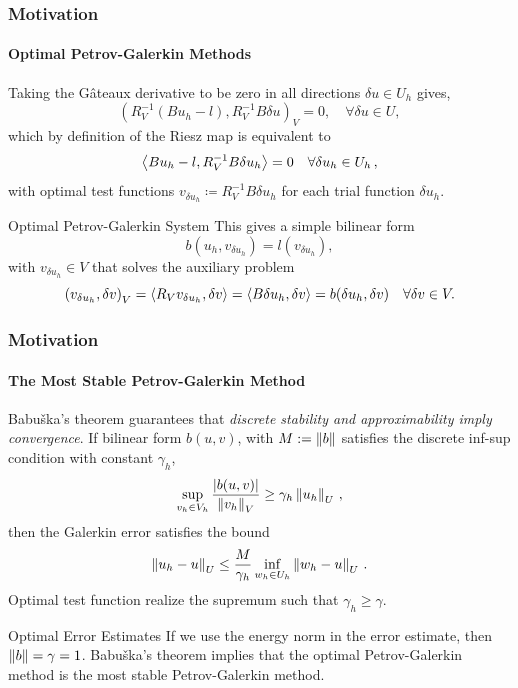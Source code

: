 \documentclass[18pt,xcolor=table]{beamer}
\begin{document}
\begin{frame}[t]
\frametitle{Motivation}
\framesubtitle{Optimal Petrov-Galerkin Methods}
Taking the G\^ateaux derivative to be zero in all directions $\delta u \in
U_h$ gives,
\[
\left(R_V^{-1}(Bu_h-l),R_V^{-1}B\delta u\right)_V = 0, \quad \forall \delta u \in U,
\]
which by definition of the Riesz map is equivalent to 
\begin{equation*}
\left\langle Bu_h-l,R_V^{-1}B\delta u_h \right\rangle=0\quad\forall\delta u_h\in U_h\,,
\end{equation*}
with optimal test functions $v_{\delta u_h}\coloneqq R_V^{-1}B\delta u_h$ for each trial function $\delta u_h$.
\begin{block}{Optimal Petrov-Galerkin System}
This gives a simple bilinear form
\begin{equation*}
b(u_h,v_{\delta u_h})=l(v_{\delta u_h}),
\end{equation*}
with $v_{\delta u_h}\in V$ that solves the auxiliary problem
\begin{equation*}
\left( v_{\delta u_h},\delta v \right)_V=\left\langle R_Vv_{\delta u_h},\delta v \right\rangle
=\left\langle B\delta u_h,\delta v \right\rangle=b(\delta u_h,\delta v)\quad\forall\delta v\in V.
\end{equation*}
\end{block}
\end{frame}


\begin{frame}[t]
\frametitle{Motivation}
\framesubtitle{The Most Stable Petrov-Galerkin Method}
Babu\v{s}ka's theorem\cite{Babuska70} guarantees that \emph{discrete stability and approximability imply convergence}.
If bilinear form $b(u,v)$, with $M:=\left\| b \right\|$ satisfies the discrete inf-sup condition 
with constant $\gamma_h$,
\[
\sup_{v_h\in V_h}\frac{|b(u,v)|}{\left\| v_h \right\|_V}\geq\gamma_h\left\| u_h \right\|_U\,,
\]
then the Galerkin error satisfies the bound
\[
\left\| u_h-u \right\|_U\leq\frac{M}{\gamma_h}\inf_{w_h\in U_h}\left\| w_h-u \right\|_U\,.
\]
Optimal test function realize the supremum such that $\gamma_h\geq\gamma$.\\
\begin{block}{Optimal Error Estimates}
If we use the energy norm in the error estimate, then $\left\| b \right\|=\gamma=1$.
Babu\v{s}ka's theorem
implies that the optimal Petrov-Galerkin method is the most stable Petrov-Galerkin method.
\end{block}
\end{frame}
\end{document}

